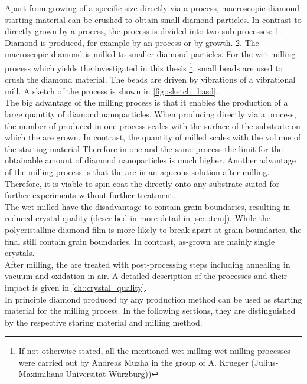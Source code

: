 	Apart from growing \nds of a specific size directly via a \CVD process, macroscopic diamond starting material can be crushed to obtain small diamond particles.
	In contrast to \nds directly grown by a \CVD process, the process is divided into two sub-processes:
	1. Diamond is produced, for example by an \HPHT process or by \CVD growth.
	2. The macroscopic diamond is milled to smaller diamond particles.
	For the wet-milling process which yields the \nds investigated in this thesis \footnote{If not otherwise stated, all the mentioned wet-milling wet-milling processes were carried out by Andreas Muzha in the group of A. Krueger (Julius-Maximilians Universit\"at W\"urzburg))}, small beads are used to crush the diamond material.
	The beads are driven by vibrations of a vibrational mill.
	A sketch of the process is shown in \autoref{fig::sketch_basd}.
	\\
	The big advantage of the milling process is that it enables the production of a large quantity of diamond nanoparticles.
	When producing \nds directly via a \CVD process, the number of produced \nds in one process scales with the surface of the substrate on which the \nds are grown.
	In contrast, the quantity of milled \nds scales with the volume of the starting material
	Therefore in one and the same process the limit for the obtainable amount of diamond nanoparticles is much higher.
	Another advantage of the milling process is that the \nds are in an aqueous solution after milling.
	Therefore, it is viable to spin-coat the \nds directly onto any substrate suited for further experiments without further treatment.
	\\
	The wet-milled \nds have the disadvantage to contain grain boundaries, resulting in reduced crystal quality (described in more detail in \ref{sec::tem}).
	While the polycristalline diamond film is more likely to break apart at grain boundaries, the final \nds still contain grain boundaries.
	In contrast, as-grown \CVD \nds are mainly single crystals.
	\\
	After milling, the \nds are treated with post-processing steps including annealing in vacuum and oxidation in air.
	A detailed description of the processes and their impact is given in \ref{ch::crystal_quality}.
	\\
	In principle diamond produced by any production method can be used as starting material for the milling process.
	In the following sections, they are distinguished by the respective staring material and milling method.



